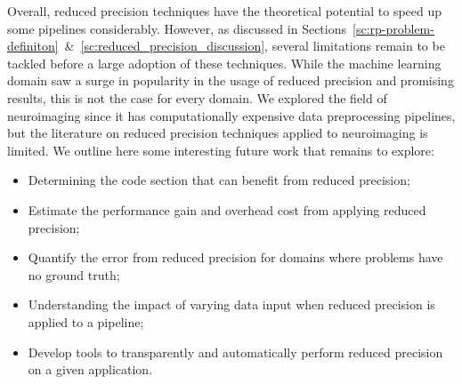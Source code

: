 Overall, reduced precision techniques have the theoretical potential to speed up
some pipelines considerably.
However, as discussed in Sections~\ref{sc:rp-problem-definiton}~\&~\ref{sc:reduced_precision_discussion},
several limitations remain to be tackled before a large adoption of these techniques.
While the machine learning domain saw a surge in popularity in the usage of reduced
precision and promising results, this is not the case for every domain.
We explored the field of neuroimaging since it has computationally expensive
data preprocessing pipelines, but the literature on reduced precision techniques
applied to neuroimaging is limited.
We outline here some interesting future work that remains to explore:
\begin{itemize}
	\item Determining the code section that can benefit from reduced precision;
	\item Estimate the performance gain and overhead cost from applying reduced precision;
	\item Quantify the error from reduced precision for domains where problems have no ground truth;
	\item Understanding the impact of varying data input when reduced precision is applied to a pipeline;
	\item Develop tools to transparently and automatically perform reduced precision on a given application.
\end{itemize}
